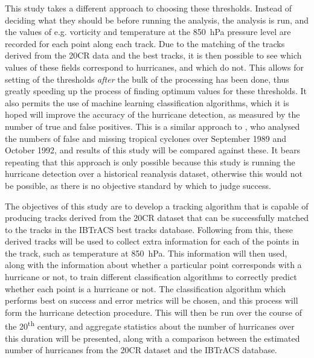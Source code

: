 \documentclass[pdftex,12pt,a4paper]{report}
\newcommand{\ts}{\textsuperscript}
\begin{document}
This study takes a different approach to choosing these thresholds. Instead of deciding what they
should be before running the analysis, the analysis is run, and the values of e.g. vorticity and
temperature at the \SI{850}{hPa} pressure level are recorded for each point along each track. Due to
the matching of the tracks derived from the 20CR data and the best tracks, it is then possible to
see which values of these fields correspond to hurricanes, and which do not. This allows for setting
of the thresholds \textit{after} the bulk of the processing has been done, thus greatly speeding up
the process of finding optimum values for these thresholds. It also permits the use of machine
learning classification algorithms, which it is hoped will improve the accuracy of the hurricane
detection, as measured by the number of true and false positives. This is a similar approach to
\textcite{walsh1997objective}, who analysed the numbers of false and missing tropical cyclones over September
1989 and October 1992, and results of this study will be compared against these. It bears repeating
that this approach is only possible because this study is running the hurricane detection over a
historical reanalysis dataset, otherwise this would not be possible, as there is no objective
standard by which to judge success.


The objectives of this study are to develop a tracking algorithm that is capable of producing tracks
derived from the 20CR dataset that can be successfully matched to the tracks in the IBTrACS best
tracks database. Following from this, these derived tracks will be used to collect extra information for
each of the points in the track, such as temperature at \SI{850}{hPa}. This information will then
used, along with the information about whether a particular point corresponds with a hurricane or
not, to train different classification algorithms to correctly predict whether each point is a
hurricane or not. The classification algorithm which performs best on success and error metrics will
be chosen, and this process will form the hurricane detection procedure. This will then be run
over the course of the 20\ts{th} century, and aggregate statistics about the number of hurricanes
over this duration will be presented, along with a comparison between the estimated number of
hurricanes from the 20CR dataset and the IBTrACS database.
\end{document}
